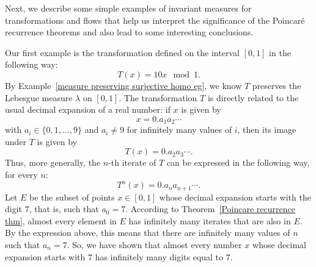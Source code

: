 Next, we describe some simple examples of invariant measures for transformations and flows that help us interpret the significance of the Poincar\'e recurrence theorems and also lead to some interesting conclusions.
\begin{example}
Our first example is the transformation defined on the interval $[0,1]$ in the following way:
\[T(x)=10x\mod 1.\]
By Example~\ref{measure preserving surjective homo eg}, we know $T$ preserves the Lebesgue measure $\lambda$ on $[0,1]$. The transformation $T$ is directly related to the usual decimal expansion of a real number: if $x$ is given by
\[x=0.a_1a_2\cdots\]
with $a_i\in\{0,1,\dots,9\}$ and $a_i\neq 9$ for infinitely many values of $i$, then its image under $T$ is given by
\[T(x)=0.a_2a_3\cdots.\]
Thus, more generally, the $n$-th iterate of $T$ can be expressed in the following way, for every $n$:
\[T^n(x)=0.a_na_{n+1}\cdots.\]
Let $E$ be the subset of points $x\in[0,1]$ whose decimal expansion starts with the digit $7$, that is, such that $a_0=7$. According to Theorem~\ref{Poincare recurrence thm}, almost every element in $E$ has infinitely many iterates that are also in $E$. By the expression above, this means that there are infinitely many values of $n$ such that $a_n=7$. So, we have shown that almost every number $x$ whose decimal expansion starts with $7$ has infinitely many digits equal to $7$.
\end{example}
